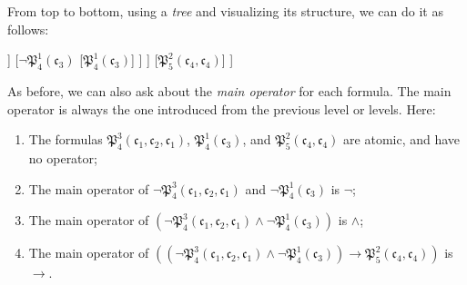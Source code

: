 \begin{center}
\begin{axiomatic}
\end{axiomatic}
\end{center}

From top to bottom, using a \textit{tree} and visualizing its structure, we can do it as follows: 

\begin{center}
	\begin{forest}
		[{$((\neg \mathfrak{P}^3_4(\mathfrak{c}_1, \mathfrak{c_2}, \mathfrak{c_1}) \wedge \neg \mathfrak{P}^1_4(\mathfrak{c}_3)) \rightarrow \mathfrak{P}^2_5(\mathfrak{c}_4, \mathfrak{c}_4))$}
		[{$(\neg \mathfrak{P}^3_4(\mathfrak{c}_1, \mathfrak{c_2}, \mathfrak{c_1}) \wedge \neg \mathfrak{P}^1_4(\mathfrak{c}_3))$}
			[{$\neg \mathfrak{P}^3_4(\mathfrak{c}_1, \mathfrak{c_2}, \mathfrak{c_1})$}
				[{$\mathfrak{P}^3_4(\mathfrak{c}_1, \mathfrak{c_2}, \mathfrak{c_1})$}]
			]
			[{$\neg \mathfrak{P}^1_4(\mathfrak{c}_3)$}
				[{$\mathfrak{P}^1_4(\mathfrak{c}_3)$}]
			]
		]
		[{$\mathfrak{P}^2_5(\mathfrak{c}_4, \mathfrak{c}_4)$}]
		]
	\end{forest}
\end{center}

As before, we can also ask about the \textit{main operator} for each formula. The main operator is always the one introduced from the previous level or levels. Here:

\begin{enumerate}
	\item The formulas $\mathfrak{P}^3_4(\mathfrak{c}_1, \mathfrak{c_2}, \mathfrak{c_1})$, $\mathfrak{P}^1_4(\mathfrak{c}_3)$, and $\mathfrak{P}^2_5(\mathfrak{c}_4, \mathfrak{c}_4)$ are atomic, and have no operator;
	\item The main operator of $\neg\mathfrak{P}^3_4(\mathfrak{c}_1, \mathfrak{c_2}, \mathfrak{c_1})$ and $\neg\mathfrak{P}^1_4(\mathfrak{c}_3)$ is $\neg$;
	\item The main operator of $(\neg \mathfrak{P}^3_4(\mathfrak{c}_1, \mathfrak{c_2}, \mathfrak{c_1}) \wedge \neg \mathfrak{P}^1_4(\mathfrak{c}_3))$ is $\wedge$;
	\item The main operator of $((\neg \mathfrak{P}^3_4(\mathfrak{c}_1, \mathfrak{c_2}, \mathfrak{c_1}) \wedge \neg \mathfrak{P}^1_4(\mathfrak{c}_3)) \rightarrow \mathfrak{P}^2_5(\mathfrak{c}_4, \mathfrak{c}_4))$ is $\rightarrow$.
\end{enumerate}

